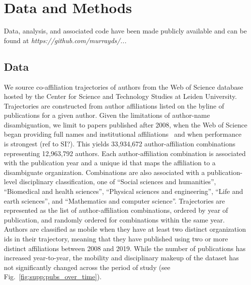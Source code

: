 \documentclass[12pt]{article} %
\begin{document}
%
%
\section*{Data and Methods}
\label{sec:datamethods} %

Data, analysis, and associated code have been made publicly available and can be found at \textit{https://github.com/murrayds/...}


\subsection*{Data}
We source co-affiliation trajectories of authors from the Web of Science database hosted by the Center for Science and Technology Studies at Leiden University. 
Trajectories are constructed from author affiliations listed on the byline of publications for a given author.
Given the limitations of author-name disambiguation, we limit to papers published after 2008, when the Web of Science began providing full names and institutional affiliations~\autocite{caron2014disambiguation} and when performance is strongest (ref to SI?). 
This yields 33,934,672 author-affiliation combinations representing 12,963,792 authors. 
Each author-affiliation combination is associated with the publication year and a unique id that maps the affiliation to a disambiguate organization. 
Combinations are also associated with a publication-level disciplinary classification, one of ``Social sciences and humanities'',
``Biomedical and health sciences'', ``Physical sciences and engineering'', ``Life and earth sciences'', and ``Mathematics and computer science''.
Trajectories are represented as the list of author-affiliation combinations, ordered by year of publication, and randomly ordered for combinations within the same year. 
Authors are classified as mobile when they have at least two distinct organization ids in their trajectory, meaning that they have published using two or more distinct affiliations between 2008 and 2019.
While the number of publications has increased year-to-year, the mobility and disciplinary makeup of the dataset has not significantly changed across the period of study (see Fig.~\ref{fig:supp:pubs_over_time}).
\end{document}
